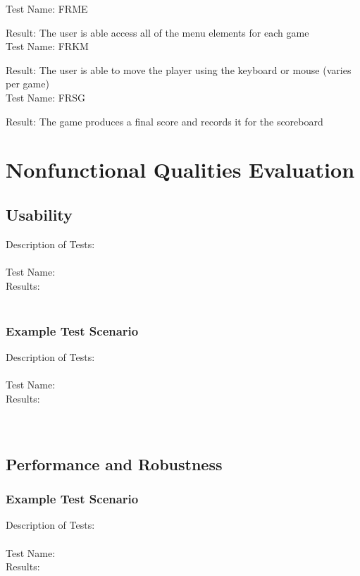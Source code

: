 \documentclass[12pt, titlepage]{article}
\begin{document}
	Test Name: FRME 
	
	Result: The user is able access all of the menu elements for each game \\
	
	Test Name: FRKM
	
	Result: The user is able to move the player using the keyboard or mouse (varies per game) \\
	
	Test Name: FRSG
	
	Result: The game produces a final score and records it for the scoreboard \\
	

\section{Nonfunctional Qualities Evaluation} 

	\subsection{Usability}
	
	Description of Tests: \\
	\\
	Test Name:\\
	Results: \\
	\\	
	
	\subsubsection{Example Test Scenario}
	
	Description of Tests: \\
	\\
	Test Name:\\
	Results: \\
	\\		
	\\	

	\subsection{Performance and Robustness}
	
	\subsubsection{Example Test Scenario}
	
	Description of Tests: \\
	\\
	Test Name:\\
	Results: \\
	\\	
\end{document}
